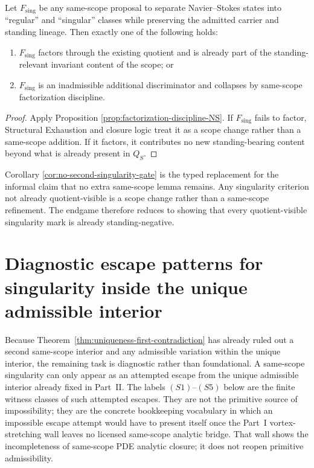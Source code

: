 \begin{corollary}\label{cor:no-second-singularity-gate}
Let $F_{\mathrm{sing}}$ be any same-scope proposal to separate Navier--Stokes states into
``regular'' and ``singular'' classes while preserving the admitted carrier and standing lineage.
Then exactly one of the following holds:
\begin{enumerate}[label=(\roman*), leftmargin=2.2em]
\item $F_{\mathrm{sing}}$ factors through the existing quotient and is already part of the
standing-relevant invariant content of the scope; or
\item $F_{\mathrm{sing}}$ is an inadmissible additional discriminator and collapses by
same-scope factorization discipline.
\end{enumerate}
\end{corollary}

\begin{proof}
Apply Proposition \ref{prop:factorization-discipline-NS}. If $F_{\mathrm{sing}}$ fails to factor,
Structural Exhaustion and closure logic treat it as a scope change rather than a same-scope addition.
If it factors, it contributes no new standing-bearing content beyond what is already present in
$Q_S$.
\end{proof}

\begin{remark}
Corollary \ref{cor:no-second-singularity-gate} is the typed replacement for the informal claim that no
extra same-scope lemma remains. Any singularity criterion not already quotient-visible is a scope
change rather than a same-scope refinement. The endgame therefore reduces to showing that every
quotient-visible singularity mark is already standing-negative.
\end{remark}

\section{Diagnostic escape patterns for singularity inside the unique admissible interior}
Because Theorem~\ref{thm:uniqueness-first-contradiction} has already ruled out a second same-scope interior and any admissible variation within the unique interior, the remaining task is diagnostic rather than foundational. A same-scope singularity can only appear as an attempted escape from the unique admissible interior already fixed in Part~II. The labels $(S1)$--$(S5)$ below are the finite witness classes of such attempted escapes. They are not the primitive source of impossibility; they are the concrete bookkeeping vocabulary in which an impossible escape attempt would have to present itself once the Part~I vortex-stretching wall leaves no licensed same-scope analytic bridge. That wall shows the incompleteness of same-scope PDE analytic closure; it does not reopen primitive admissibility.

